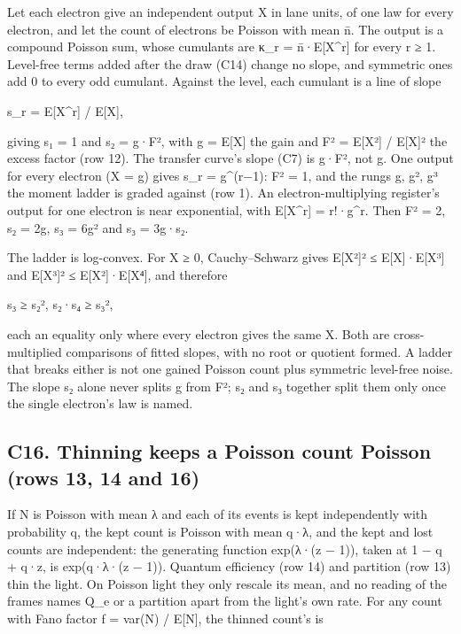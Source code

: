 Let each electron give an independent output X in lane units, of one law for every electron, and let the count of electrons be Poisson with mean n̄. The output is a compound Poisson sum, whose cumulants are κ\_\allowbreak{}r = n̄·E[X\textasciicircum{}r] for every r ≥ 1. Level-free terms added after the draw (C14) change no slope, and symmetric ones add 0 to every odd cumulant. Against the level, each cumulant is a line of slope

s\_\allowbreak{}r = E[X\textasciicircum{}r] / E[X],

giving s₁ = 1 and s₂ = g·F², with g = E[X] the gain and F² = E[X²] / E[X]² the excess factor (row 12). The transfer curve's slope (C7) is g·F², not g. One output for every electron (X = g) gives s\_\allowbreak{}r = g\textasciicircum{}(r−1): F² = 1, and the rungs g, g², g³ the moment ladder is graded against (row 1). An electron-multiplying register's output for one electron is near exponential, with E[X\textasciicircum{}r] = r!·g\textasciicircum{}r. Then F² = 2, s₂ = 2g, s₃ = 6g² and s₃ = 3g·s₂.

The ladder is log-convex. For X ≥ 0, Cauchy–Schwarz gives E[X²]² ≤ E[X]·E[X³] and E[X³]² ≤ E[X²]·E[X⁴], and therefore

s₃ ≥ s₂²,  s₂·s₄ ≥ s₃²,

each an equality only where every electron gives the same X. Both are cross-multiplied comparisons of fitted slopes, with no root or quotient formed. A ladder that breaks either is not one gained Poisson count plus symmetric level-free noise. The slope s₂ alone never splits g from F²; s₂ and s₃ together split them only once the single electron's law is named.

\subsection{\texorpdfstring{C16. Thinning keeps a Poisson count Poisson (rows 13, 14 and 16)}{C16. Thinning keeps a Poisson count Poisson (rows 13, 14 and 16)}}

If N is Poisson with mean λ and each of its events is kept independently with probability q, the kept count is Poisson with mean q·λ, and the kept and lost counts are independent: the generating function exp(λ·(z − 1)), taken at 1 − q + q·z, is exp(q·λ·(z − 1)). Quantum efficiency (row 14) and partition (row 13) thin the light. On Poisson light they only rescale its mean, and no reading of the frames names Q\_\allowbreak{}e or a partition apart from the light's own rate. For any count with Fano factor f = var(N) / E[N], the thinned count's is

